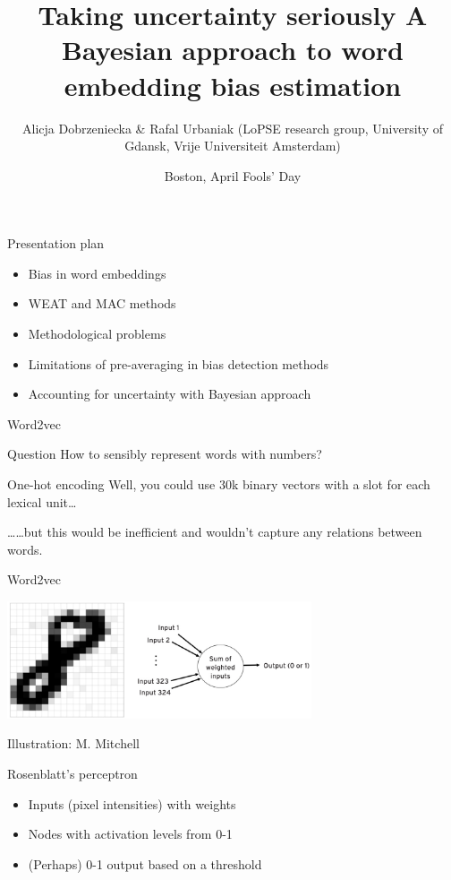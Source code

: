 \documentclass[
  10pt,
  ignorenonframetext,
  x11names, dvipsnames, bibspacing,natbib, table]{beamer}
\title{\Large Taking uncertainty seriously \newline \normalsize A
Bayesian approach to word embedding bias estimation}
\author{Alicja Dobrzeniecka \& Rafal Urbaniak
\footnotesize \newline (LoPSE research group, University of Gdansk,
Vrije Universiteit Amsterdam)}
\date{Boston, April Fools' Day}
\providecommand{\tightlist}{%
  \setlength{\itemsep}{0pt}\setlength{\parskip}{0pt}}
\begin{document}
\frame{\titlepage}

\begin{frame}{Presentation plan}
\protect\hypertarget{presentation-plan}{}
\begin{itemize}
\tightlist
\item
  Bias in word embeddings
\item
  WEAT and MAC methods
\item
  Methodological problems
\item
  Limitations of pre-averaging in bias detection methods
\item
  Accounting for uncertainty with Bayesian approach
\end{itemize}
\end{frame}

\begin{frame}{Word2vec}
\protect\hypertarget{word2vec}{}
\begin{block}{Question}
\protect\hypertarget{question}{}
How to sensibly represent words with numbers?

\pause
\end{block}

\begin{block}{One-hot encoding}
\protect\hypertarget{one-hot-encoding}{}
Well, you could use 30k binary vectors with a slot for each lexical
unit\dots

\pause

\dots \dots but this would be inefficient and wouldn't capture any
relations between words.
\end{block}
\end{frame}

\begin{frame}{Word2vec}
\protect\hypertarget{word2vec-1}{}
\begin{center}
 \includegraphics[width = 9cm]{images/perceptron1.png}
\end{center}

\vspace{-3mm}

\tiny \hfill \color{gray}Illustration: M. Mitchell \color{black}

\footnotesize

\begin{block}{Rosenblatt's perceptron}
\begin{itemize}
\item Inputs (pixel intensities) with weights
\item Nodes with activation levels from 0-1
\item (Perhaps) 0-1 output based on a threshold
\end{itemize}
\end{block}
\end{frame}
\end{document}
